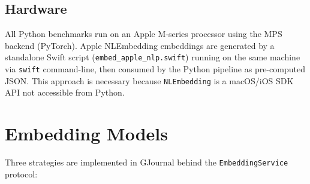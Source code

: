 \subsection{Hardware}

All Python benchmarks run on an Apple M-series processor using the MPS backend (PyTorch). Apple NLEmbedding embeddings are generated by a standalone Swift script (\texttt{embed\_apple\_nlp.swift}) running on the same machine via \texttt{swift} command-line, then consumed by the Python pipeline as pre-computed JSON. This approach is necessary because \texttt{NLEmbedding} is a macOS/iOS SDK API not accessible from Python.

\section{Embedding Models}

Three strategies are implemented in GJournal behind the \texttt{EmbeddingService} protocol:

